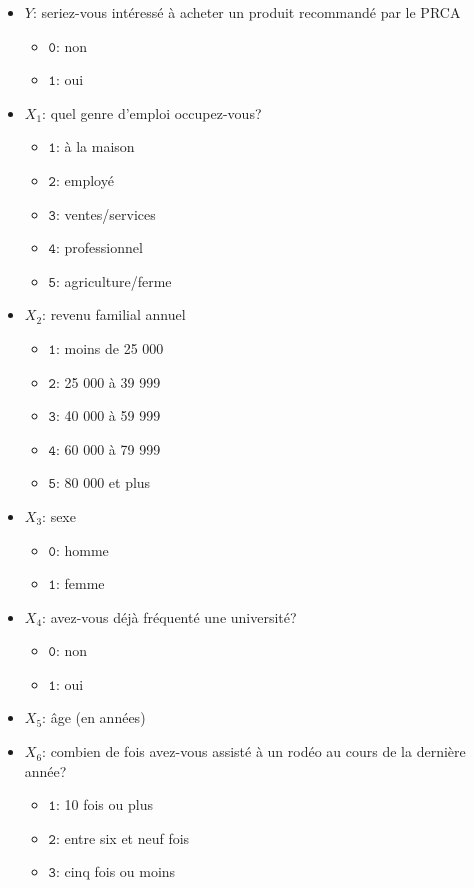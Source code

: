 \documentclass[
  11pt,
  letterpaper,
]{book}
\providecommand{\tightlist}{%
  \setlength{\itemsep}{0pt}\setlength{\parskip}{0pt}}
\theoremstyle{definition}
\theoremstyle{definition}
\theoremstyle{definition}
\theoremstyle{remark}
\begin{document}
\begin{itemize}
\tightlist
\item
  \(Y\): seriez-vous intéressé à acheter un produit recommandé par le PRCA

  \begin{itemize}
  \tightlist
  \item
    \(\texttt{0}\): non
  \item
    \(\texttt{1}\): oui
  \end{itemize}
\item
  \(X_1\): quel genre d'emploi occupez-vous?

  \begin{itemize}
  \tightlist
  \item
    \(\texttt{1}\): à la maison
  \item
    \(\texttt{2}\): employé
  \item
    \(\texttt{3}\): ventes/services
  \item
    \(\texttt{4}\): professionnel
  \item
    \(\texttt{5}\): agriculture/ferme
  \end{itemize}
\item
  \(X_2\): revenu familial annuel

  \begin{itemize}
  \tightlist
  \item
    \(\texttt{1}\): moins de 25 000
  \item
    \(\texttt{2}\): 25 000 à 39 999
  \item
    \(\texttt{3}\): 40 000 à 59 999
  \item
    \(\texttt{4}\): 60 000 à 79 999
  \item
    \(\texttt{5}\): 80 000 et plus
  \end{itemize}
\item
  \(X_3\): sexe

  \begin{itemize}
  \tightlist
  \item
    \(\texttt{0}\): homme
  \item
    \(\texttt{1}\): femme
  \end{itemize}
\item
  \(X_4\): avez-vous déjà fréquenté une université?

  \begin{itemize}
  \tightlist
  \item
    \(\texttt{0}\): non
  \item
    \(\texttt{1}\): oui
  \end{itemize}
\item
  \(X_5\): âge (en années)
\item
  \(X_6\): combien de fois avez-vous assisté à un rodéo au cours de la dernière année?

  \begin{itemize}
  \tightlist
  \item
    \(\texttt{1}\): 10 fois ou plus
  \item
    \(\texttt{2}\): entre six et neuf fois
  \item
    \(\texttt{3}\): cinq fois ou moins
  \end{itemize}
\end{itemize}
\end{document}
